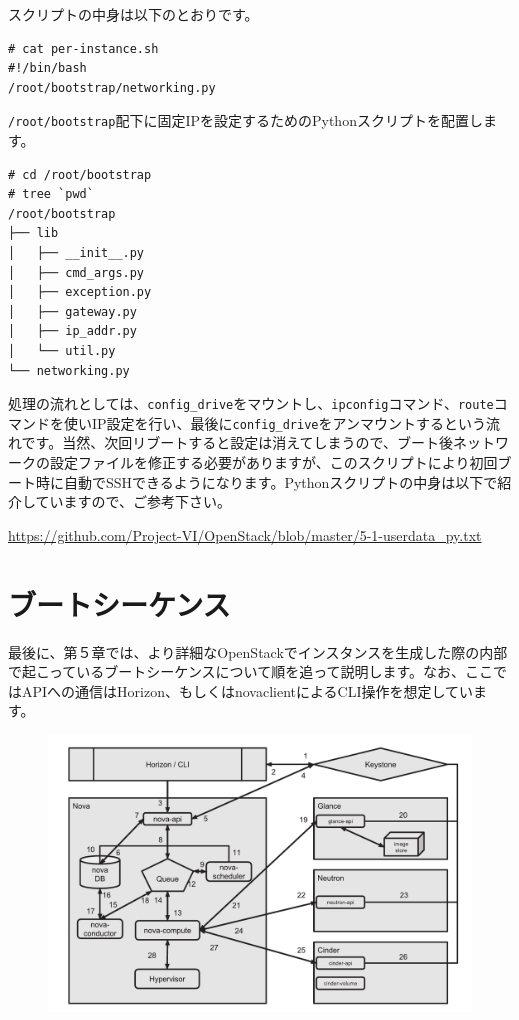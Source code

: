 \documentclass[9pt,b5paper,tombo,openany,dvipdfmx]{jsbook}
\begin{document}
スクリプトの中身は以下のとおりです。

\begin{lstlisting}
# cat per-instance.sh
#!/bin/bash
/root/bootstrap/networking.py
\end{lstlisting}

\verb|/root/bootstrap|配下に固定IPを設定するためのPythonスクリプトを配置します。

\begin{verbatim}
# cd /root/bootstrap
# tree `pwd`
/root/bootstrap
├── lib
│   ├── __init__.py
│   ├── cmd_args.py
│   ├── exception.py
│   ├── gateway.py
│   ├── ip_addr.py
│   └── util.py
└── networking.py
\end{verbatim}

処理の流れとしては、\verb|config_drive|をマウントし、\verb|ipconfig|コマンド、\verb|route|コマンドを使いIP設定を行い、最後に\verb|config_drive|をアンマウントするという流れです。当然、次回リブートすると設定は消えてしまうので、ブート後ネットワークの設定ファイルを修正する必要がありますが、このスクリプトにより初回ブート時に自動でSSHできるようになります。Pythonスクリプトの中身は以下で紹介していますので、ご参考下さい。

\url{https://github.com/Project-VI/OpenStack/blob/master/5-1-userdata_py.txt}

\chapter{ブートシーケンス}

最後に、第５章では、より詳細なOpenStackでインスタンスを生成した際の内部で起こっているブートシーケンスについて順を追って説明します。なお、ここではAPIへの通信はHorizon、もしくはnovaclientによるCLI操作を想定しています。

\begin{figure}[htbp]
	\begin{center}
		\includegraphics[width=\textwidth]{./img/boot.pdf}
	\end{center}
\end{figure}
\end{document}
